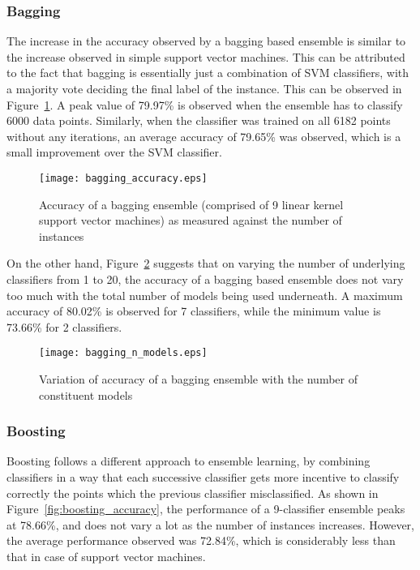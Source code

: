 \subsubsection{Bagging}
The increase in the accuracy observed by a bagging based ensemble is similar to the increase observed in simple support vector machines. This can be attributed to the fact that bagging is essentially just a combination of SVM classifiers, with a majority vote deciding the final label of the instance. This can be observed in Figure~\ref{fig:bagging_accuracy}. A peak value of 79.97\% is observed when the ensemble has to classify 6000 data points. Similarly, when the classifier was trained on all 6182 points without any iterations, an average accuracy of 79.65\% was observed, which is a small improvement over the SVM classifier.

\begin{figure}
    \centering
    \texttt{[image: bagging\_accuracy.eps]}
    \caption{Accuracy of a bagging ensemble (comprised of 9 linear kernel support vector machines) as measured against the number of instances}
    \label{fig:bagging_accuracy}
\end{figure}

On the other hand, Figure~\ref{fig:bagging_n_models} suggests that on varying the number of underlying classifiers from 1 to 20, the accuracy of a bagging based ensemble does not vary too much with the total number of models being used underneath. A maximum accuracy of 80.02\% is observed for 7 classifiers, while the minimum value is 73.66\% for 2 classifiers.

\begin{figure}
    \centering
    \texttt{[image: bagging\_n\_models.eps]}
    \caption{Variation of accuracy of a bagging ensemble with the number of constituent models}
    \label{fig:bagging_n_models}
\end{figure}

\subsubsection{Boosting}
Boosting follows a different approach to ensemble learning, by combining classifiers in a way that each successive classifier gets more incentive to classify correctly the points which the previous classifier misclassified. As shown in Figure~\ref{fig:boosting_accuracy}, the performance of a 9-classifier ensemble peaks at 78.66\%, and does not vary a lot as the number of instances increases. However, the average performance observed was 72.84\%, which is considerably less than that in case of support vector machines.

